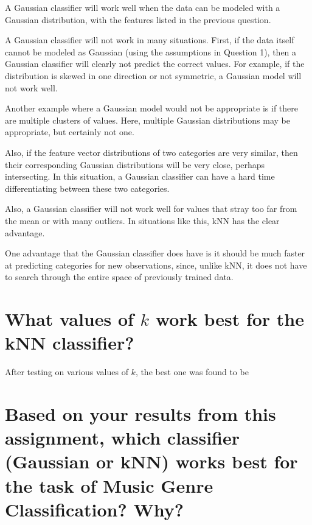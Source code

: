 \documentclass[a4paper,titlepage]{article}
\begin{document}
	A Gaussian classifier will work well when the data can be modeled with a Gaussian distribution, with the features listed in the previous question.
	
	A Gaussian classifier will not work in many situations. First, if the data itself cannot be modeled as Gaussian (using the assumptions in Question 1), then a Gaussian classifier will clearly not predict the correct values. For example, if the distribution is skewed in one direction or not symmetric, a Gaussian model will not work well.
	
	Another example where a Gaussian model would not be appropriate is if there are multiple clusters of values. Here, multiple Gaussian distributions may be appropriate, but certainly not one.
	
	Also, if the feature vector distributions of two categories are very similar, then their corresponding Gaussian distributions will be very close, perhaps intersecting. In this situation, a Gaussian classifier can have a hard time differentiating between these two categories.
	
	Also, a Gaussian classifier will not work well for values that stray too far from the mean or with many outliers. In situations like this, kNN has the clear advantage.
	
	One advantage that the Gaussian classifier does have is it should be much faster at predicting categories for new observations, since, unlike kNN, it does not have to search through the entire space of previously trained data.
	
	\section{What values of $k$ work best for the kNN classifier?}

	After testing on various values of $k$, the best one was found to be 
	
	
	\section{Based on your results from this assignment, which classifier (Gaussian or kNN) works best for the task of Music Genre Classification? Why?}
	
\end{document}
